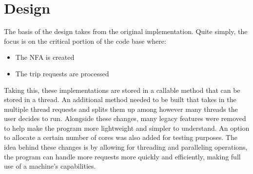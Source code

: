 \documentclass[English]{article}
\theoremstyle{remark}
\numberwithin{equation}{section}
\begin{document}
\section{Design}
\label{sec:design}
The basis of the design takes from the original implementation. Quite simply, the focus is on the critical portion of the code base where:
\begin{itemize}
    \item The NFA is created
    \item The trip requests are processed
\end{itemize}
Taking this, these implementations are stored in a callable method that can be stored in a thread. An additional method needed to be built that takes in the multiple thread requests and splits them up among however many threads the user decides to run. Alongside these changes, many legacy features were removed to help make the program more lightweight and simpler to understand. An option to allocate a certain number of cores was also added for testing purposes.
The idea behind these changes is by allowing for threading and paralleling operations, the program can handle more requests more quickly and efficiently, making full use of a machine's capabilities. 
\end{document}
